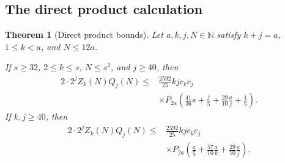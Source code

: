\documentclass[11pt]{article}
\newtheorem{theorem}{Theorem}[section]
\theoremstyle{definition}
\theoremstyle{remark}
\begin{document}
\subsection{The direct product calculation}

\begin{theorem}[Direct product bounds]\label{thm:direct-product}
Let $a,k,j,N\in\mathbb N$ satisfy $k+j=a$, $1\le k<a$, and $N\le12a$.

If $s\ge32$, $2\le k\le s$, $N\le s^2$, and $j\ge40$, then
\begin{equation}\label{eq:small-core}
\begin{split}
 2\cdot 2^j Z_k(N)Q_j(N)
 \le{}&\frac{2592}{25}kjc_kc_j\\
 &\times P_{2a}\left(
 \frac{41}{36}s+\frac j5+
 \frac{29}{10}\frac aj+\frac15\right).
\end{split}
\end{equation}
If $k,j\ge40$, then
\begin{equation}\label{eq:tempered-core}
\begin{split}
 2\cdot 2^j Z_k(N)Q_j(N)
 \le{}&\frac{2592}{25}kjc_kc_j\\
 &\times P_{2a}\left(
 \frac a5+\frac{57}{10}\frac ak+
 \frac{29}{10}\frac aj\right).
\end{split}
\end{equation}
\end{theorem}
\end{document}
